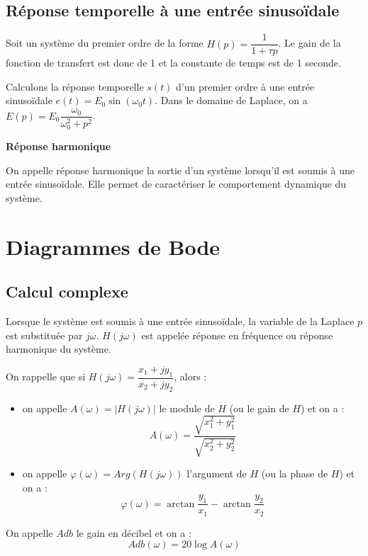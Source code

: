 \documentclass[10pt,oneside]{article}
\begin{document}
\subsection{Réponse temporelle à une entrée sinusoïdale}

Soit un système du premier ordre de la forme $H(p)=\dfrac{1}{1+\tau p}$. Le gain de la fonction de transfert est donc de 1 et la constante de temps est de 1 seconde. 

Calculons la réponse temporelle $s(t)$ d'un premier ordre à une entrée sinusoïdale $e(t)=E_0  \sin \left( \omega_0 t\right)$. Dans le domaine de Laplace, on a $E(p)=E_0\dfrac{\omega_0}{\omega_0^2+p^2}$.



\begin{defi}
\textbf{Réponse harmonique}

On appelle réponse harmonique la sortie d'un système lorsqu'il est soumis à une entrée sinusoïdale. Elle permet de caractériser le comportement dynamique du système.
\end{defi}

\section{Diagrammes de Bode}

\subsection{Calcul complexe}
Lorsque le système est soumis à une entrée sinusoïdale, la variable de la Laplace $p$ est substituée par $j\omega$. $H(j\omega)$ est appelée réponse en fréquence ou réponse harmonique du système.

\begin{resultat}
On rappelle que si $H(j\omega) = \dfrac{x_1+jy_1}{x_2+jy_2}$, alors : 
\begin{itemize}
\item on appelle $A(\omega)=|H(j\omega)|$ le module de $H$ (ou le gain de $H$) et on a : 
$$
A(\omega)= \dfrac{\sqrt{x_1^2+y_1^2}}{\sqrt{x_2^2+y_2^2}}
$$
\item on appelle $\varphi(\omega)=Arg(H(j\omega))$ l'argument de $H$ (ou la phase de $H$) et on a : 
$$
\varphi(\omega)= \arctan \dfrac{y_1}{x_1}-\arctan \dfrac{y_2}{x_2}
$$
\end{itemize}
\end{resultat}

\begin{rem}
On appelle $Adb$ le gain en décibel et on a :
$$
Adb(\omega)=20 \log A(\omega)
$$
\end{rem}
\end{document}
